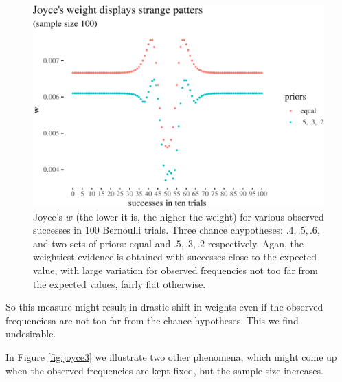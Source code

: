\documentclass[
  10pt,
  dvipsnames,enabledeprecatedfontcommands]{scrartcl}
\begin{document}
\begin{figure}

\begin{center}\includegraphics[width=1\linewidth]{imprecision_weight_files/figure-latex/joyce2-1} \end{center}

\caption{Joyce's $w$ (the lower it is, the higher the weight) for various observed successes in 100 Bernoulli trials. Three chance chypotheses: $.4, .5, .6$, and two sets of priors: equal and $.5, .3, .2$ respectively. Agan, the weightiest evidence is obtained with successes close to the expected value, with  large variation for observed frequencies not too far from the expected values, fairly flat otherwise.}
\label{fig:joyce2}
\end{figure}

So this measure might result in drastic shift in weights even if the
observed frequenciesa are not too far from the chance hypotheses. This
we find undesirable.

In Figure \ref{fig:joyce3} we illustrate two other phenomena, which
might come up when the observed frequencies are kept fixed, but the
sample size increases.
\end{document}
